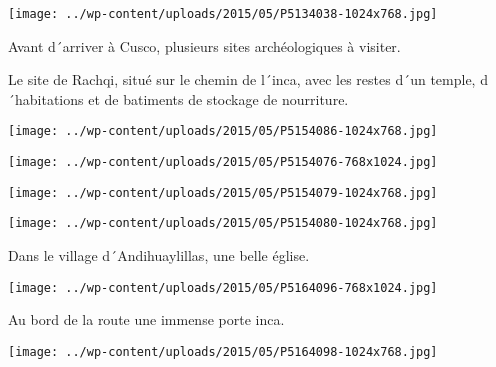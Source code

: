  

 

\begin{center} \texttt{[image: ../wp-content/uploads/2015/05/P5134038-1024x768.jpg]} \end{center}

 

 Avant d´arriver à Cusco, plusieurs sites archéologiques à visiter.

 Le site de Rachqi, situé sur le chemin de l´inca, avec les restes d´un temple, d´habitations et de batiments de stockage de nourriture. 

 

\begin{center} \texttt{[image: ../wp-content/uploads/2015/05/P5154086-1024x768.jpg]} \end{center}

 

 

\begin{center} \texttt{[image: ../wp-content/uploads/2015/05/P5154076-768x1024.jpg]} \end{center}

 

 

\begin{center} \texttt{[image: ../wp-content/uploads/2015/05/P5154079-1024x768.jpg]} \end{center}

 

 

\begin{center} \texttt{[image: ../wp-content/uploads/2015/05/P5154080-1024x768.jpg]} \end{center}

 

 Dans le village d´Andihuaylillas, une belle église. 

 

\begin{center} \texttt{[image: ../wp-content/uploads/2015/05/P5164096-768x1024.jpg]} \end{center}

 

 Au bord de la route une immense porte inca. 

 

\begin{center} \texttt{[image: ../wp-content/uploads/2015/05/P5164098-1024x768.jpg]} \end{center}


